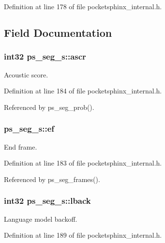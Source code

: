Definition at line 178 of file pocketsphinx\-\_\-internal.\-h.



\subsection{Field Documentation}
\subsubsection[{ascr}]{\setlength{\rightskip}{0pt plus 5cm}int32 ps\-\_\-seg\-\_\-s\-::ascr}\label{structps__seg__s_a6f7706ec4c0d0ec8ecafaf0f29f41f4b}


Acoustic score. 



Definition at line 184 of file pocketsphinx\-\_\-internal.\-h.



Referenced by ps\-\_\-seg\-\_\-prob().

\subsubsection[{ef}]{ ps\-\_\-seg\-\_\-s\-::ef}\label{structps__seg__s_ab25ecc6af8d2695c6097cf7e934eadd4}


End frame. 



Definition at line 183 of file pocketsphinx\-\_\-internal.\-h.



Referenced by ps\-\_\-seg\-\_\-frames().

\subsubsection[{lback}]{\setlength{\rightskip}{0pt plus 5cm}int32 ps\-\_\-seg\-\_\-s\-::lback}\label{structps__seg__s_a4d86c21f1ed2dc3eb3b1b1b37ce9bb48}


Language model backoff. 



Definition at line 189 of file pocketsphinx\-\_\-internal.\-h.




